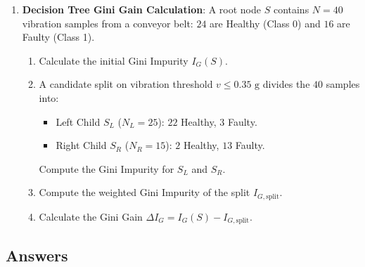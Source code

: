 \begin{checkyourself}
\begin{enumerate}
    \item \textbf{Decision Tree Gini Gain Calculation}:
    A root node $S$ contains $N = 40$ vibration samples from a conveyor belt: $24$ are Healthy (Class 0) and $16$ are Faulty (Class 1).
    \begin{enumerate}[label=(\alph*)]
        \item Calculate the initial Gini Impurity $I_G(S)$.
        \item A candidate split on vibration threshold $v \le 0.35\text{ g}$ divides the $40$ samples into:
        \begin{itemize}
            \item Left Child $S_L$ ($N_L = 25$): $22$ Healthy, $3$ Faulty.
            \item Right Child $S_R$ ($N_R = 15$): $2$ Healthy, $13$ Faulty.
        \end{itemize}
        Compute the Gini Impurity for $S_L$ and $S_R$.
        \item Compute the weighted Gini Impurity of the split $I_{G,\text{split}}$.
        \item Calculate the Gini Gain $\Delta I_G = I_G(S) - I_{G,\text{split}}$.
    \end{enumerate}
\end{enumerate}
\end{checkyourself}

\subsection*{Answers}

